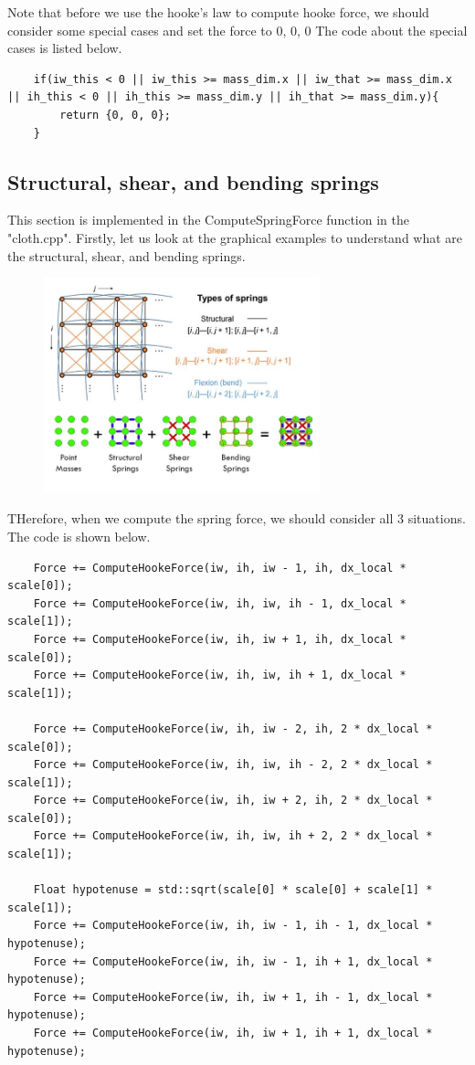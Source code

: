 \documentclass[acmtog]{acmart}
\begin{document}
Note that before we use the hooke's law to compute hooke force, we should consider some special cases and set the force to {0, 0, 0}
The code about the special cases is listed below.
\begin{lstlisting}
	if(iw_this < 0 || iw_this >= mass_dim.x || iw_that >= mass_dim.x || ih_this < 0 || ih_this >= mass_dim.y || ih_that >= mass_dim.y){
    	return {0, 0, 0};
  	}
\end{lstlisting}
\subsection{Structural, shear, and bending springs}
\quad This section is implemented in the ComputeSpringForce function in the "cloth.cpp". Firstly, let us look at the graphical examples to understand what are the 
structural, shear, and bending springs.
\begin{figure}[h]
	\centering
	{\includegraphics[width=8cm]{spring.JPG}}	
\end{figure}

THerefore, when we compute the spring force, we should consider all 3 situations. The code is shown below.
\begin{lstlisting}
	Force += ComputeHookeForce(iw, ih, iw - 1, ih, dx_local * scale[0]);
	Force += ComputeHookeForce(iw, ih, iw, ih - 1, dx_local * scale[1]);
	Force += ComputeHookeForce(iw, ih, iw + 1, ih, dx_local * scale[0]);
	Force += ComputeHookeForce(iw, ih, iw, ih + 1, dx_local * scale[1]);

	Force += ComputeHookeForce(iw, ih, iw - 2, ih, 2 * dx_local * scale[0]);
	Force += ComputeHookeForce(iw, ih, iw, ih - 2, 2 * dx_local * scale[1]);
	Force += ComputeHookeForce(iw, ih, iw + 2, ih, 2 * dx_local * scale[0]); 
	Force += ComputeHookeForce(iw, ih, iw, ih + 2, 2 * dx_local * scale[1]);

	Float hypotenuse = std::sqrt(scale[0] * scale[0] + scale[1] * scale[1]);
	Force += ComputeHookeForce(iw, ih, iw - 1, ih - 1, dx_local * hypotenuse);
	Force += ComputeHookeForce(iw, ih, iw - 1, ih + 1, dx_local * hypotenuse);
	Force += ComputeHookeForce(iw, ih, iw + 1, ih - 1, dx_local * hypotenuse);
	Force += ComputeHookeForce(iw, ih, iw + 1, ih + 1, dx_local * hypotenuse);
\end{lstlisting}
\end{document}
